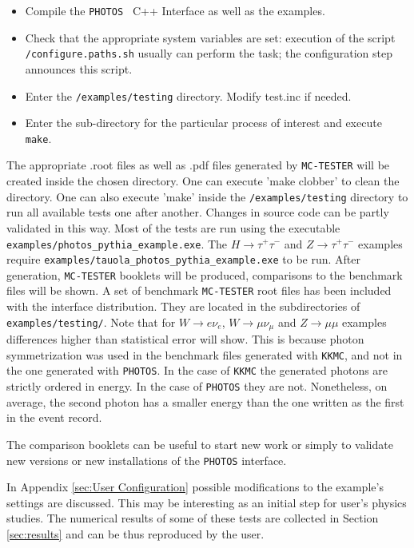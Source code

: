 \documentclass[]{Photos_interface_design}
\begin{document}
\begin{itemize}
  \item Compile the {\tt PHOTOS } C++ Interface as well as the examples. 
 \item  Check that the appropriate system variables are set: execution of  the script \\
{\tt /configure.paths.sh} usually can perform the task; the configuration step 
announces this script.
  \item Enter the {\tt /examples/testing} directory. Modify test.inc if needed.
  \item Enter the sub-directory for the particular process of interest
and execute {\tt make}.
\end{itemize}

The appropriate .root files as well as .pdf files generated by {\tt MC-TESTER}
will be created inside the chosen directory. One can execute 'make clobber' to
clean the directory. One can also execute 'make' inside the {\tt /examples/testing}
directory to run all available tests one after another. Changes in source
code  can  be partly validated in this way.
Most of the tests are run using the executable {\tt examples/photos\_pythia\_example.exe}. The 
 $H \rightarrow \tau^+ \tau^-$ and $Z \rightarrow \tau^+ \tau^-$ examples 
require
{\tt examples/tauola\_photos\_pythia\_example.exe} to be run.
After generation, {\tt MC-TESTER} booklets will be produced,
 comparisons to the benchmark files will be shown.
A set of benchmark {\tt MC-TESTER} root files has been included with the interface
distribution. They are located in the subdirectories of {\tt examples/testing/}.
Note that for $W \rightarrow e \nu_e$, 
$W \rightarrow \mu \nu_\mu$ and $Z \rightarrow \mu \mu$
examples   differences higher than statistical error will show. 
This is because  photon symmetrization
was used in the benchmark files generated with {\tt KKMC}, and not in the one 
generated with {\tt PHOTOS}.
In the case of {\tt KKMC} the generated photons are strictly ordered in energy. 
In the case of {\tt PHOTOS} they are not. Nonetheless, on average, 
the second photon has a smaller energy than the one written as the first
in the event record.


The comparison booklets can be useful 
to start new work or simply to 
validate new versions or new installations of the {\tt PHOTOS} interface.

In Appendix \ref{sec:User Configuration} possible modifications to the  
example's settings are discussed. This may be interesting as an initial step for user's 
physics studies.  The numerical results of some of these tests are collected in Section \ref{sec:results}
and can be thus reproduced by the user.
\end{document}
